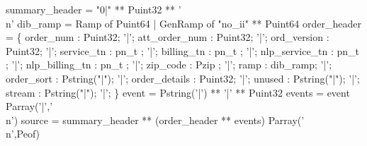  summary\_header = "0|" ** Puint32 ** '\\n'
\mbox{}
 dib\_ramp = 
  Ramp of Puint64 
| GenRamp of "no\_ii" ** Puint64
\mbox{}
 order\_header = \{
       order\_num       : Puint32;
 '|';  att\_order\_num  : Puint32;             
 '|';  ord\_version     : Puint32;         
 '|';  service\_tn      : pn\_t ;
 '|';  billing\_tn      : pn\_t ;          
 '|';  nlp\_service\_tn : pn\_t ;
 '|';  nlp\_billing\_tn : pn\_t ;
 '|';  zip\_code        : Pzip ;
 '|';  ramp             : dib\_ramp; 
 '|';  order\_sort      : Pstring("|");
 '|';  order\_details   : Puint32;             
 '|';  unused           : Pstring("|");
 '|';  stream           : Pstring("|");
 '|';
\}
\mbox{}
 event  = Pstring('|') **  '|' ** Puint32
\mbox{}
 events = event Parray('|','\\n')
\mbox{}
 source = summary\_header ** (order\_header ** events) Parray('\\n',Peof)
